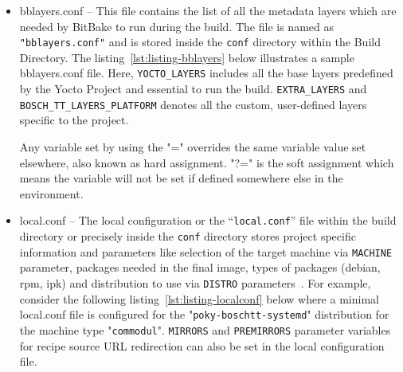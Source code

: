 \begin{itemize}
 
\item{bblayers.conf} – This file contains the list of all the metadata layers which are needed by BitBake to run during the build. The file is named as \texttt{"bblayers.conf"} and is stored inside the \texttt{conf} directory within the Build Directory. The listing~\ref{lst:listing-bblayers} below illustrates a sample bblayers.conf file. Here, \texttt{YOCTO\_LAYERS} includes all the base layers predefined by the Yocto Project and essential to run the build. \texttt{EXTRA\_LAYERS} and \texttt{BOSCH\_TT\_LAYERS\_PLATFORM} denotes all the custom, user-defined layers specific to the project. 

\vspace{0.5cm}
\lstset{style=mystyle}

\vspace{0.5cm}

Any variable set by using the "=" overrides the same variable value set elsewhere, also known as hard assignment. "?=" is the soft assignment which means the variable will not be set if defined somewhere else in the environment.


\item{local.conf} – The local configuration or the “\texttt{local.conf}” file within the build directory or precisely inside the \texttt{conf} directory stores project specific information and  parameters like selection of the target machine via \texttt{MACHINE} parameter, packages needed in the final image, types of packages (debian, rpm, ipk) and distribution to use via \texttt{DISTRO} parameters~\parencite{swain2015design}. For example, consider the following listing~\ref{lst:listing-localconf} below where a minimal local.conf file is configured for the "\texttt{poky-boschtt-systemd}" distribution for the machine type "\texttt{commodul}". \texttt{MIRRORS} and \texttt{PREMIRRORS} parameter variables for recipe source \ac{URL} redirection can also be set in the local configuration file.

\vspace{0.5cm}
\lstset{style=mystyle}


\vspace{0.5cm}
\end{itemize}

